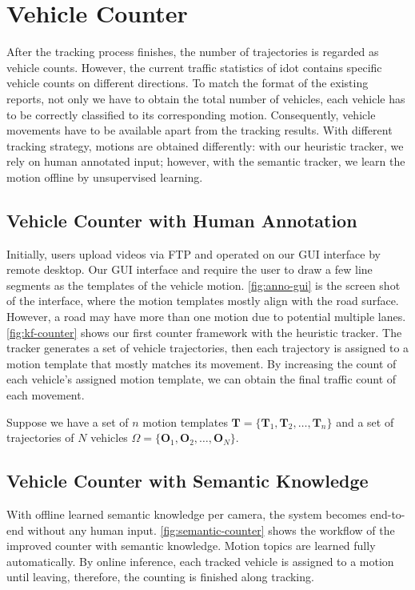 \section{Vehicle Counter}
\label{sec:system-counter}

After the tracking process finishes, the number of trajectories is regarded as vehicle counts.
However, the current traffic statistics of \gls{idot} contains specific vehicle counts on different directions. 
To match the format of the existing reports, not only we have to obtain the total number of vehicles, each vehicle has to be correctly classified to its corresponding motion.
Consequently, vehicle movements have to be available apart from the tracking results.
With different tracking strategy, motions are obtained differently: with our heuristic tracker, we rely on human annotated input; however, with the semantic tracker, we learn the motion offline by unsupervised learning.

\subsection{Vehicle Counter with Human Annotation}
Initially, users upload videos via FTP and operated on our GUI interface by remote desktop.
Our GUI interface and require the user to draw a few line segments as the templates of the vehicle motion.
\ref{fig:anno-gui} is the screen shot of the interface, where the motion templates mostly align with the road surface. 
However, a road may have more than one motion due to potential multiple lanes. 
\ref{fig:kf-counter} shows our first counter framework with the heuristic tracker. 
The tracker generates a set of vehicle trajectories, then each trajectory is assigned to a motion template that mostly matches its movement. 
By increasing the count of each vehicle's assigned motion template, we can obtain the final traffic count of each movement. 

Suppose we have a set of $n$ motion templates $\mathbf{T} = \{\mathbf{T}_1, \mathbf{T}_2, \dots, \mathbf{T}_n\}$ and a set of trajectories of $N$ vehicles $\Omega= \{\mathbf{O}_1, \mathbf{O}_2, \dots, \mathbf{O}_N\}$.




\subsection{Vehicle Counter with Semantic Knowledge}
With offline learned semantic knowledge per camera, the system becomes end-to-end without any human input. 
\ref{fig:semantic-counter} shows the workflow of the improved counter with semantic knowledge. 
Motion topics are learned fully automatically.
By online inference, each tracked vehicle is assigned to a motion until leaving, therefore, the counting is finished along tracking. 

